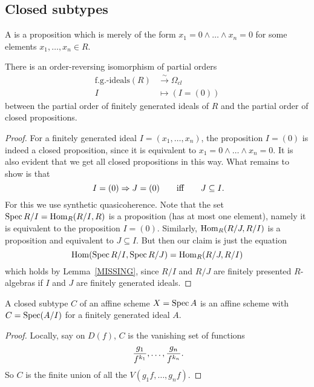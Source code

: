 
\subsection{Closed subtypes}

\begin{definition}%
  A  is a proposition
  which is merely of the form $x_1 = 0 \land \dots \land x_n = 0$
  for some elements $x_1, \dots, x_n \in R$.
\end{definition}

\begin{proposition}%
  There is an order-reversing isomorphism of partial orders
  \begin{align*}
    \text{f.g.-ideals}(R) &\xrightarrow{{\sim}} \Omega_{cl} \\
    I &\mapsto (I = (0))
  \end{align*}
  between the partial order of finitely generated ideals of $R$
  and the partial order of closed propositions.
\end{proposition}

\begin{proof}
  For a finitely generated ideal $I = (x_1, \dots, x_n)$,
  the proposition $I = (0)$ is indeed a closed proposition,
  since it is equivalent to $x_1 = 0 \land \dots \land x_n = 0$.
  It is also evident that we get all closed propositions in this way.
  What remains to show is that
  \[ I = (0) \Rightarrow J = (0)
     \qquad\text{iff}\qquad
     J \subseteq I
     \rlap{\text{.}}
  \]
  For this we use synthetic quasicoherence.
  Note that the set $\operatorname{Spec} R/I = \mathrm{Hom}_R(R/I, R)$ is a proposition
  (has at most one element),
  namely it is equivalent to the proposition $I = (0)$.
  Similarly, $\mathrm{Hom}_R(R/J, R/I)$ is a proposition
  and equivalent to $J \subseteq I$.
  But then our claim is just the equation
  \[ \mathrm{Hom}(\operatorname{Spec} R/I, \operatorname{Spec} R/J) = \mathrm{Hom}_R(R/J, R/I) \]
  which holds by Lemma~\ref{MISSING},
  since $R/I$ and $R/J$ are finitely presented $R$-algebras
  if $I$ and $J$ are finitely generated ideals.
\end{proof}

\begin{lemma}%
  \label{lem:closed-subtype-affine}
  A closed subtype $C$ of an affine scheme $X=\operatorname{Spec} A$ is an affine scheme
  with $C=\operatorname{Spec} (A/I)$ for a finitely generated ideal $A$.
\end{lemma}

\begin{proof}
  Locally, say on $D(f)$, $C$ is the vanishing set of functions
  \[ \frac{g_1}{f^{k_1}},\dots,\frac{g_n}{f^{k_n}}\rlap{.} \]
  So $C$ is the finite union of all the $V(g_1f,\dots,g_nf)$.
\end{proof}

